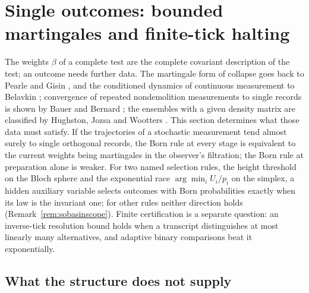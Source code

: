 \documentclass[aps,pra,onecolumn,superscriptaddress,nofootinbib,10pt]{revtex4-2}
\theoremstyle{definition}
\theoremstyle{remark}
\begin{document}
\section{Single outcomes: bounded martingales and finite-tick halting}\label{sec:outcomes}
The weights $\beta$ of a complete test are the complete covariant description of the test; an outcome needs
further data.  The martingale form of collapse goes back to Pearle \cite{rf:Pearle1976,rf:Pearle1979} and Gisin \cite{rf:Gisin1984}, and
the conditioned dynamics of continuous measurement to Belavkin \cite{rf:Belavkin1989,rf:Belavkin1992}; convergence of repeated
nondemolition measurements to single records is shown by Bauer and Bernard \cite{rf:Bauer2011}; the ensembles with a given
density matrix are classified by Hughston, Jozsa and Wootters \cite{rf:Hughston1993}.  This section determines what those data must satisfy.  If the trajectories of a
stochastic measurement tend almost surely to single orthogonal records, the Born rule at every stage is
equivalent to the current weights being martingales in the observer's filtration; the Born rule at
preparation alone is weaker.  For two named selection rules, the height threshold on the Bloch sphere and
the exponential race $\arg\min_iU_i/p_i$ on the simplex, a hidden auxiliary variable selects outcomes with Born
probabilities exactly when its law is the invariant one; for other rules neither direction holds
(Remark~\ref{rem:sobasinscope}).  Finite certification is a separate
question: an inverse-tick resolution bound holds when a transcript distinguishes at most linearly many
alternatives, and adaptive binary comparisons beat it exponentially.

\subsection{What the structure does not supply}
\end{document}
